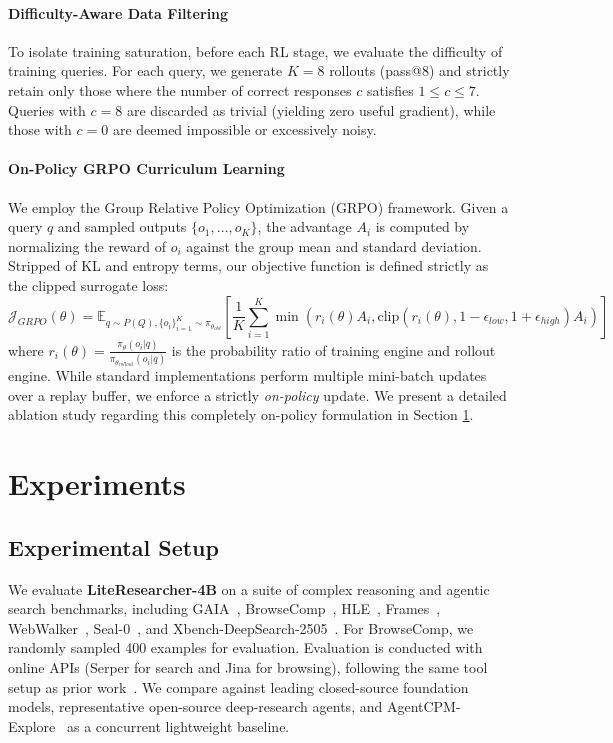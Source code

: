 \documentclass{article} %
\theoremstyle{plain}
\theoremstyle{definition}
\theoremstyle{remark}
\begin{document}
\paragraph{Difficulty-Aware Data Filtering}
To isolate training saturation, before each RL stage, we evaluate the difficulty of training queries. For each query, we generate $K=8$ rollouts (pass@8) and strictly retain only those where the number of correct responses $c$ satisfies $1 \le c \le 7$. Queries with $c=8$ are discarded as trivial (yielding zero useful gradient), while those with $c=0$ are deemed impossible or excessively noisy. 



\paragraph{On-Policy GRPO Curriculum Learning}
We employ the Group Relative Policy Optimization (GRPO) \citep{shao2024deepseekmath} framework. Given a query $q$ and sampled outputs $\{o_1, \dots, o_K\}$, the advantage $A_i$ is computed by normalizing the reward of $o_i$ against the group mean and standard deviation. Stripped of KL and entropy terms, our objective function is defined strictly as the clipped surrogate loss:
$$
\mathcal{J}_{GRPO}(\theta) = \mathbb{E}_{q \sim P(Q), \{o_i\}_{i=1}^K \sim \pi_{\theta_{old}}} \left[ \frac{1}{K} \sum_{i=1}^K \min \left( r_i(\theta) A_i, \text{clip}\left( r_i(\theta), 1-\epsilon_{low}, 1+\epsilon_{high} \right) A_i \right) \right]
$$
where $r_i(\theta) = \frac{\pi_\theta(o_i|q)}{\pi_{\theta_{rollout}}(o_i|q)}$ is the probability ratio of training engine and rollout engine. While standard implementations perform multiple mini-batch updates over a replay buffer, we enforce a strictly \textit{on-policy} update. We present a detailed ablation study regarding this completely on-policy formulation in Section \ref{sec:experiments}.




\section{Experiments}
\label{sec:experiments}
\subsection{Experimental Setup}

We evaluate \textbf{LiteResearcher-4B} on a suite of complex reasoning and agentic search benchmarks,
including GAIA~\citep{mialon2023gaia}, BrowseComp~\citep{wei2025browsecomp}, HLE~\citep{phan2025hle},
Frames~\citep{krishna2024frames}, WebWalker~\citep{wu2025webwalker}, Seal-0~\citep{pham2025sealqa},
and Xbench-DeepSearch-2505~\citep{chen2025xbench}. For BrowseComp, we randomly sampled 400 examples for evaluation. Evaluation is conducted with online APIs (Serper for search and Jina for browsing), following the same tool setup as prior work~\citep{team2025tongyi}. We compare against leading closed-source foundation models, representative open-source deep-research agents, and AgentCPM-Explore~\citep{chen2026agentcpm} as a concurrent lightweight baseline. 
\end{document}

